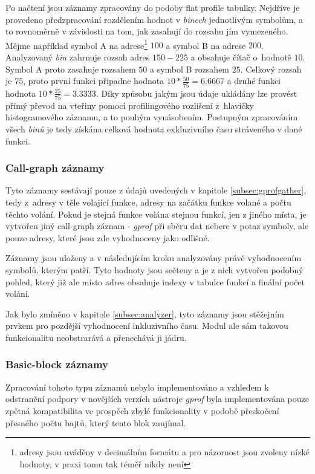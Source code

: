 \documentclass[czech,BP]{thesiskiv}
\begin{document}
Po načtení jsou záznamy zpracovány do podoby flat profile tabulky. Nejdříve je provedeno předzpracování rozdělením hodnot v \emph{binech} jednotlivým symbolům, a to rovnoměrně v závislosti na tom, jak zasahují do rozsahu jím vymezeného. Mějme například symbol A na adrese\footnote{adresy jsou uváděny v decimálním formátu a pro názornost jsou zvoleny nízké hodnoty, v praxi tomu tak téměř nikdy není} $100$ a symbol B na adrese $200$. Analyzovaný \emph{bin} zahrnuje rozsah adres $150 - 225$ a obsahuje čítač o~hodnotě $10$. Symbol A proto zasahuje rozsahem $50$ a symbol B rozsahem $25$. Celkový rozsah je $75$, proto první funkci připadne hodnota $10*\frac{50}{75}=6.6667$ a druhé funkci hodnota $10*\frac{25}{75}=3.3333$. Díky způsobu jakým jsou údaje ukládány lze provést přímý převod na vteřiny pomocí profilingového rozlišení z~hlavičky histogramového záznamu, a to pouhým vynásobením. Postupným zpracováním všech \emph{binů} je tedy získána celková hodnota exkluzivního času stráveného v dané funkci.

\subsubsection*{Call-graph záznamy}

Tyto záznamy sestávají pouze z údajů uvedených v kapitole \ref{subsec:gprofgather}, tedy z~adresy v těle volající funkce, adresy na začátku funkce volané a počtu těchto volání. Pokud je stejná funkce volána stejnou funkcí, jen z jiného místa, je vytvořen jiný call-graph záznam - \emph{gprof} při sběru dat nebere v potaz symboly, ale pouze adresy, které jsou zde vyhodnoceny jako odlišné.

Záznamy jsou uloženy a v následujícím kroku analyzovány právě vyhodnocením symbolů, kterým patří. Tyto hodnoty jsou sečteny a je z nich vytvořen podobný pohled, který již ale místo adres obsahuje indexy v tabulce funkcí a finální počet volání.

Jak bylo zmíněno v kapitole \ref{subsec:analyzer}, tyto záznamy jsou stěžejním prvkem pro pozdější vyhodnocení inkluzivního času. Modul ale sám takovou funkcionalitu neobstrarává a přenechává ji jádru.

\subsubsection*{Basic-block záznamy}

Zpracování tohoto typu záznamů nebylo implementováno a vzhledem k odstranění podpory v novějších verzích nástroje \emph{gprof} byla implementována pouze zpětná kompatibilita ve prospěch zbylé funkcionality v podobě přeskočení přesného počtu bajtů, který tento blok zaujímal.
\end{document}
